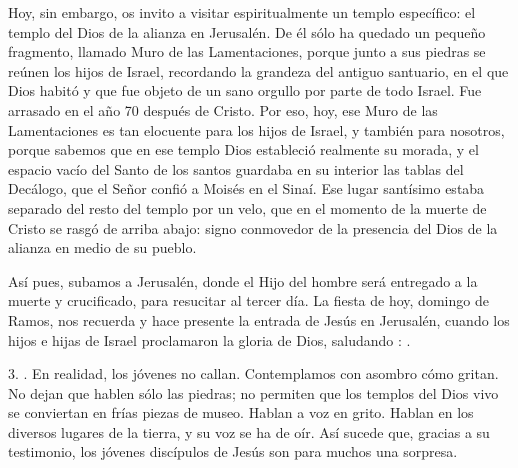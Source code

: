 \begin{body}
Hoy, sin embargo, os invito a visitar espiritualmente un templo específico: el templo del Dios de la alianza en Jerusalén. De él sólo ha quedado un pequeño fragmento, llamado Muro de las Lamentaciones, porque junto a sus piedras se reúnen los hijos de Israel, recordando la grandeza del antiguo santuario, en el que Dios habitó y que fue objeto de un sano orgullo por parte de todo Israel. Fue arrasado en el año 70 después de Cristo. Por eso, hoy, ese Muro de las Lamentaciones es tan elocuente para los hijos de Israel, y también para nosotros, porque sabemos que en ese templo Dios estableció realmente su morada, y el espacio vacío del Santo de los santos guardaba en su interior las tablas del Decálogo, que el Señor confió a Moisés en el Sinaí. Ese lugar santísimo estaba separado del resto del templo por un velo, que en el momento de la muerte de Cristo se rasgó de arriba abajo: signo conmovedor de la presencia del Dios de la alianza en medio de su pueblo.

Así pues, subamos a Jerusalén, donde el Hijo del hombre será entregado a la muerte y crucificado, para resucitar al tercer día. La fiesta de hoy, domingo de Ramos, nos recuerda y hace presente la entrada de Jesús en Jerusalén, cuando los hijos e hijas de Israel proclamaron la gloria de Dios, saludando : .

3. . En realidad, los jóvenes no callan. Contemplamos con asombro cómo gritan. No dejan que hablen sólo las piedras; no permiten que los templos del Dios vivo se conviertan en frías piezas de museo. Hablan a voz en grito. Hablan en los diversos lugares de la tierra, y su voz se ha de oír. Así sucede que, gracias a su testimonio, los jóvenes discípulos de Jesús son para muchos una sorpresa.



\end{body}
